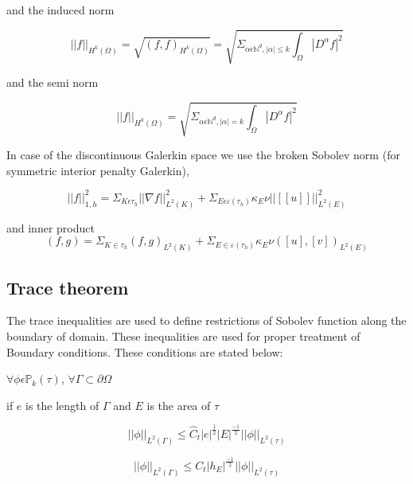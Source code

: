 \documentclass[a4paper,12pt]{book}
\begin{document}
and the induced norm 

\begin{equation}
||f||_{H^k (\Omega)} = \sqrt{(f,f)_{H^k(\Omega)}} = \sqrt{\Sigma_{\alpha \epsilon \mathbb{N}^d, |\alpha| \leq k} \int_\Omega |D^\alpha f|^2}
\end{equation}

and the semi norm 

\begin{equation}
||f||_{H^k (\Omega)} = \sqrt{\Sigma_{\alpha \epsilon \mathbb{N}^d, |\alpha| = k} \int_\Omega |D^\alpha f|^2}
\end{equation}

In case of the discontinuous Galerkin space we use the broken Sobolev norm (for symmetric interior penalty Galerkin), \cite{Montlaur2}

\begin{equation}
||f||_{1,h}^2 = \Sigma_{K \epsilon \tau_h} ||\nabla f||_{L^2(K)}^2 + \Sigma_{E \epsilon \varepsilon(\tau_h)} \kappa_E \nu ||[[u]]||_{L^2 (E)}^2
\end{equation}

and inner product \\

\begin{equation}
(f,g) = \Sigma_{K \in \tau_h} (f,g)_{L^2(K)} + \Sigma_{E \in \varepsilon(\tau_h)} \kappa_E \nu ([u],[v])_{L^2 (E)}
\end{equation}


\subsection{Trace theorem} \cite{riviere}

The trace inequalities are used to define restrictions of Sobolev function along the boundary of domain. These inequalities are used for proper treatment of Boundary conditions. These conditions are stated below:

$\forall \phi \epsilon \mathbb{P}_k(\tau)$, $\forall \Gamma \subset \partial \Omega$

if $e$ is the length of $\Gamma$ and $E$ is the area of $\tau$

\begin{equation}
||\phi||_{L^2(\Gamma)} \leq \hat{C}_t |e|^{\frac{1}{2}} |E|^{\frac{-1}{2}} ||\phi||_{L^2(\tau)}
\end{equation}

\begin{equation}
||\phi||_{L^2(\Gamma)} \leq {C}_t |h_E|^{\frac{-1}{2}} ||\phi||_{L^2(\tau)}
\end{equation}
\end{document}
